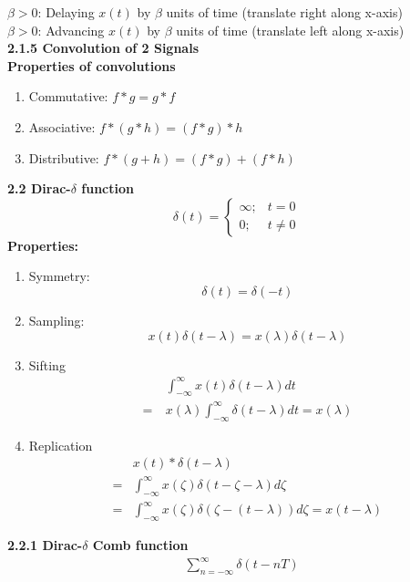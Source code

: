 \documentclass[6pt,landscape,a4paper]{extarticle}
\begin{document}
\begin{multicols*}{5}
    $\beta > 0$: Delaying $x(t)$ by $\beta$ units of time (translate right along x-axis)\\
    $\beta > 0$: Advancing $x(t)$ by $\beta$ units of time (translate left along x-axis)\\
    \textbf{2.1.5 Convolution of 2 Signals}\\
    \textbf{Properties of convolutions}
    \begin{enumerate}
        \item Commutative: $f * g = g * f$
        \item Associative: $f * (g * h) = (f * g) * h$
        \item Distributive: $f * (g + h) = (f * g) + (f * h)$
    \end{enumerate}
    \textbf{2.2 Dirac-$\delta$ function}\\
    \[
        \delta(t)=
        \begin{cases}
            \infty; &t=0\\
            0; &t\neq0
        \end{cases}
    \]
    \textbf{Properties: }
    \begin{enumerate}
        \item Symmetry:
        \[
            \delta(t)=\delta(-t) \tag{2.3}
        \]
        \item Sampling: 
        \[
            x(t)\delta(t-\lambda)=x(\lambda)\delta(t-\lambda) \tag{2.4}
        \]
        \item Sifting
        \begin{align*}
            &\int_{-\infty}^{\infty} x(t)\delta(t-\lambda)dt\\
            =\ &x(\lambda)\int_{-\infty}^{\infty}\delta(t-\lambda)dt=x(\lambda) \tag{2.5}
        \end{align*}
        \item Replication
        \begin{align*}
            &x(t)*\delta(t-\lambda)\\
            =&\int_{-\infty}^{\infty}x(\zeta)\delta(t-\zeta-\lambda)d\zeta\\
            =&\int_{-\infty}^{\infty}x(\zeta)\delta(\zeta-(t-\lambda))d\zeta=x(t-\lambda) \tag{2.6}
        \end{align*}
    \end{enumerate}
    \textbf{2.2.1 Dirac-$\delta$ Comb function}\\
    \begin{align*}
        &\sum_{n=-\infty}^{\infty}\delta(t-nT)\\

\end{align*}
\end{multicols*}
\end{document}

